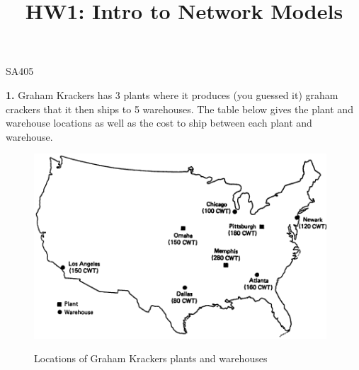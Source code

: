 \documentclass[11pt]{article}
\makeatletter
\theoremstyle{definition}
\renewcommand{\maketitle}{
  \noindent SA405 

  \begin{center}\Large{\textbf{\@title}}\end{center}
}
\makeatother
\begin{document}
\title{HW1: Intro to Network Models}

\maketitle

\textbf{1.} Graham Krackers has 3 plants where it produces (you guessed it) graham crackers that it then ships to 5 warehouses. The table below gives the plant and warehouse locations as well as the cost to ship between each plant and warehouse.

\begin{figure}[h!!!]
    \centering
    \includegraphics[width=4.3in]{map}\\
    \caption{Locations of Graham Krackers plants and warehouses}
\end{figure}
\end{document}

